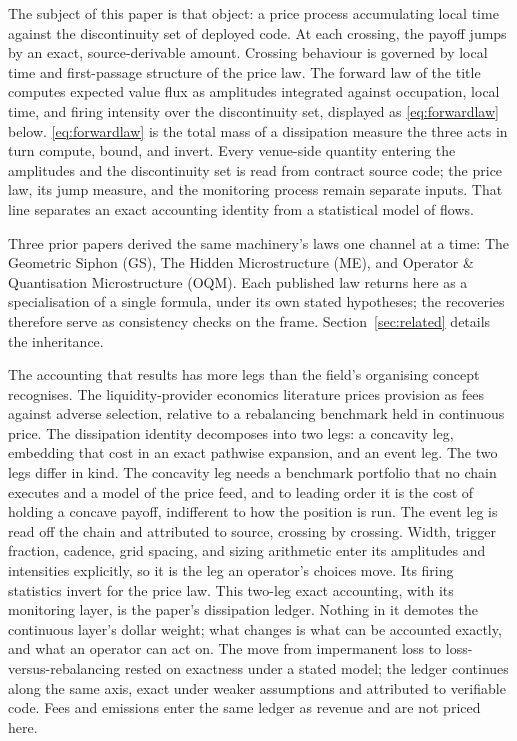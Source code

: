 \documentclass[11pt,a4paper]{article}
\theoremstyle{definition}
\theoremstyle{plain}
\theoremstyle{remark}
\begin{document}
The subject of this paper is that object: a price process accumulating local time against the discontinuity set of deployed
code. At each crossing, the payoff jumps by an exact, source-derivable amount. Crossing behaviour is governed by local time and first-passage
structure of the price law. The forward law of the title computes expected value flux as amplitudes integrated against occupation, local time, and 
firing intensity over the discontinuity set, displayed as \eqref{eq:forwardlaw} below. \eqref{eq:forwardlaw} is the total mass of a 
dissipation measure the three acts in turn compute, bound, and invert. Every venue-side quantity entering the amplitudes and the discontinuity 
set is read from contract source code; the price law, its jump measure, and the monitoring process remain separate inputs. That line separates 
an exact accounting identity from a statistical model of flows.

Three prior papers derived the same machinery's laws one channel at a time: The Geometric Siphon\cite{ryan2026siphon} (GS), The Hidden
Microstructure\cite{ryan2026master} (ME), and Operator \& Quantisation Microstructure\cite{ryan2026omqm} (OQM). Each published law returns here 
as a specialisation of a single formula, under its own stated hypotheses; the recoveries therefore serve as consistency checks on the frame. 
Section~\ref{sec:related} details the inheritance.

The accounting that results has more legs than the field's organising concept recognises. The liquidity-provider economics literature prices
provision as fees against adverse selection, relative to a rebalancing benchmark held in continuous price.\cite{milionis2022} The dissipation 
identity decomposes into two legs: a concavity leg, embedding that cost in an exact pathwise expansion, and an event leg. The two legs differ in 
kind. The concavity leg needs a benchmark portfolio that no chain executes and a model of the price feed, and to leading order it is the cost of 
holding a concave payoff, indifferent to how the position is run. The event leg is read off the chain and attributed to source, crossing by crossing. 
Width, trigger fraction, cadence, grid spacing, and sizing arithmetic enter its amplitudes and intensities explicitly, so it is the leg an operator's 
choices move. Its firing statistics invert for the price law. This two-leg exact accounting, with its monitoring layer, is the paper's dissipation
ledger. Nothing in it demotes the continuous layer's dollar weight; what changes is what can be accounted exactly, and what an operator can act on. 
The move from impermanent loss to loss-versus-rebalancing rested on exactness under a stated model; the ledger continues along the same axis, exact 
under weaker assumptions and attributed to verifiable code. Fees and emissions enter the same ledger as revenue and are not priced here.
\end{document}
